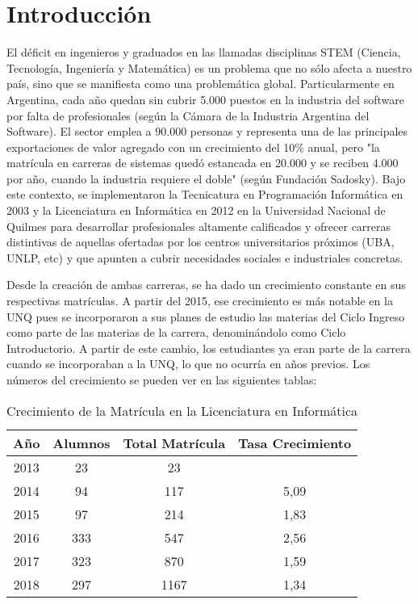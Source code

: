 \chapter{Introducción}
\label{sec:introduccion}


El déficit en ingenieros y graduados en las llamadas disciplinas STEM (Ciencia, Tecnología, Ingeniería y Matemática) es un problema que no sólo afecta a nuestro país, sino que se manifiesta como una problemática global. Particularmente en Argentina, cada año quedan sin cubrir 5.000 puestos en la industria del software por falta de profesionales (según la Cámara de la Industria Argentina del Software). El sector emplea a 90.000 personas y representa una de las principales exportaciones de valor agregado con un crecimiento del 10\% anual, pero "la matrícula en carreras de sistemas quedó estancada en 20.000 y se reciben 4.000 por año, cuando la industria requiere el doble" (según Fundación Sadosky).
Bajo este contexto, se implementaron la Tecnicatura en Programación Informática en 2003 y la Licenciatura en Informática en 2012 en la Universidad Nacional de Quilmes para desarrollar profesionales altamente calificados y ofrecer carreras distintivas de aquellas ofertadas por los centros universitarios próximos (UBA, UNLP, etc) y que apunten a cubrir necesidades sociales e industriales concretas.
 
Desde la creación de ambas carreras, se ha dado un crecimiento constante  en sus respectivas matrículas. A partir del 2015, ese crecimiento es más notable en la UNQ pues se incorporaron a sus planes de estudio las materias del Ciclo Ingreso como parte de las materias de la carrera, denominándolo como Ciclo Introductorio. A partir de este cambio, los estudiantes ya eran parte de la carrera cuando se incorporaban a la UNQ, lo que no ocurría en años previos. Los números del crecimiento se pueden ver en las siguientes tablas:


\begin{table}[]
    \centering
    \begin{tabular}{|c|c|c|c|}
    \hline
    Año & Alumnos & Total Matrícula & Tasa Crecimiento \\
    \hline
    2013 & 23 & 23 & \\
    \hline
    2014 & 94 & 117 & 5,09 \\ 
    \hline
    2015 & 97 & 214 & 1,83 \\
    \hline
    2016 & 333 & 547 & 2,56 \\
    \hline
    2017 & 323 & 870 & 1,59 \\ 
    \hline
    2018 & 297 & 1167 & 1,34 \\ 
    \hline
    \end{tabular}
    \caption{Crecimiento de la Matrícula en la Licenciatura en Informática}
    \label{tab:tabla_planes}
\end{table}



